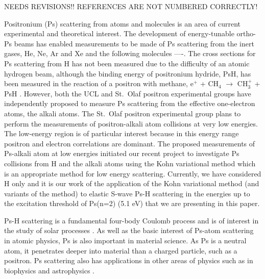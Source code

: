 \documentclass[preprint,showpacs,preprintnumbers,amsmath,amssymb]{revtex4}
\newcommand{\todoi}{\todo[inline]}
\begin{document}
\noindent
NEEDS REVISIONS!!
REFERENCES ARE NOT NUMBERED CORRECTLY!
\todoi{NEED TO MENTION POSITRONIUM HYDRIDE IN THE INTRO}

Positronium (Ps) scattering from atoms and molecules is an area of current experimental and theoretical interest. The development of energy-tunable ortho-Ps beams \cite{} has enabled measurements
to be made of Ps scattering from the inert gases, He, Ne, Ar and Xe \cite{} and the following molecules ----. The cross sections for Ps scattering from H has not been measured due to the difficulty
of an atomic hydrogen beam, although the binding energy of positronium hydride, PsH, has been measured in the reaction of a positron with methane, e$^+$ + CH$_4$ $\to$ CH$_3^+$ + PsH \cite{}.
However, both the UCL \cite{} and St.~Olaf \cite{} positron experimental groups have independently proposed to measure  Ps scattering from the effective one-electron atoms, the alkali atoms.
The St.~Olaf positron experimental group  plans to perform the measurements of positron-alkali atom collisions at very low energies. The low-energy region is of particular interest
because in this energy range positron and electron correlations are dominant. The proposed measurements of Ps-alkali atom at low energies initiated our recent project to investigate Ps collisions from
H and the alkali atoms using the Kohn variational method which is an appropriate method for low energy scattering. Currently, we have considered H only and it is our work of the application of the Kohn variational method
(and variants of the method) to elastic S-wave Ps-H scattering in the energies up to the excitation threshold of Ps(n=2) (5.1 eV) that we are presenting in this paper.

Ps-H scattering is a fundamental four-body Coulomb process
and is of interest in the study of solar processes \cite{}.
As well as the basic interest of Ps-atom scattering in atomic physics,
Ps is also important in material science.
As Ps is a neutral atom, it penetrates deeper into material than a charged particle,
such as a positron.
Ps scattering also has applications
in other areas of physics such as in biophysics and astrophysics \cite{}.
\end{document}

